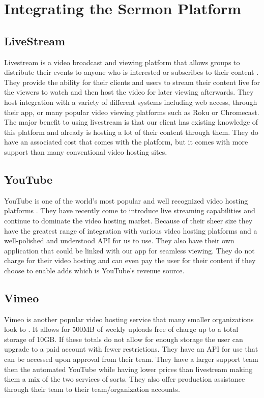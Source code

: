 \documentclass[letterpaper,10pt,draftclsnofoot,onecolumn,titlepage]{IEEEtran}
\begin{document}
	\section{Integrating the Sermon Platform}
	\subsection{LiveStream}
		Livestream is a video broadcast and viewing platform that allows groups to distribute their events to anyone who is interested or subscribes to their content \cite{LiveStream}. They provide the ability for their clients and users to stream their content live for the viewers to watch and then host the video for later viewing afterwards. They host integration with a variety of different systems including web access, through their app, or many popular video viewing platforms such as Roku or Chromecast. The major benefit to using livestream is that our client has existing knowledge of this platform and already is hosting a lot of their content through them. They do have an associated cost that comes with the platform, but it comes with more support than many conventional video hosting sites.
	\subsection{YouTube}
		YouTube is one of the world’s most popular and well recognized video hosting platforms \cite{YouTube}. They have recently come to introduce live streaming capabilities and continue to dominate the video hosting market. Because of their sheer size they have the greatest range of integration with various video hosting platforms and a well-polished and understood API for us to use. They also have their own application that could be linked with our app for seamless viewing. They do not charge for their video hosting and can even pay the user for their content if they choose to enable adds which is YouTube’s revenue source.
	\subsection{Vimeo}
	Vimeo is another popular video hosting service that many smaller organizations look to \cite{Vimeo}. It allows for 500MB of weekly uploads free of charge up to a total storage of 10GB. If these totals do not allow for enough storage the user can upgrade to a paid account with fewer restrictions. They have an API for use that can be accessed upon approval from their team. They have a larger support team then the automated YouTube while having lower prices than livestream making them a mix of the two services of sorts. They also offer production assistance through their team to their team/organization accounts.  
\end{document}
